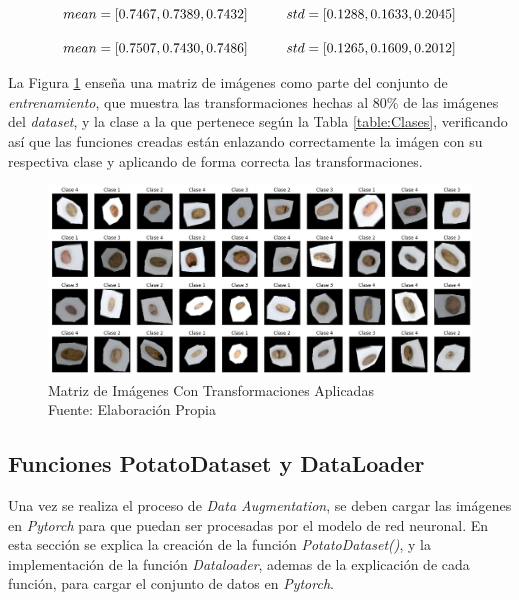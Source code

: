 \begin{equation}				{mean = [0.7467, 0.7389, 0.7432] \hspace*{1cm}  std  = [0.1288, 0.1633, 0.2045]}
	\label{eq:meanstd1}
\end{equation}


\begin{equation}
	{mean = [0.7507, 0.7430, 0.7486] \hspace*{1cm}  std  = [0.1265, 0.1609, 0.2012]}
	\label{eq:meanstd2}
\end{equation}

\vspace{0.3cm}
La Figura \ref{fig:agumentation} enseña una matriz de imágenes como parte del conjunto de \textit{entrenamiento}, que muestra las transformaciones hechas al $80\%$ de las imágenes del \textit{dataset}, y la clase a la que pertenece según la Tabla \ref{table:Clases}, verificando así que las funciones creadas están enlazando correctamente la imágen con su respectiva clase y aplicando de forma correcta las transformaciones.

\newpage
\begin{figure}[ht]
	\centering
	\includegraphics[scale=0.4]{Figs/augmentation.png}
	\caption{Matriz de Imágenes Con Transformaciones Aplicadas \\ Fuente: Elaboración Propia}
	\label{fig:agumentation}
\end{figure}	

\subsection{Funciones PotatoDataset y DataLoader}

Una vez se realiza el proceso de \textit{Data Augmentation}, se deben cargar las imágenes en \textit{Pytorch} para que puedan ser procesadas por el modelo de red neuronal. En esta sección se explica la creación de la función \textit{PotatoDataset()}, y la implementación de la función \textit{Dataloader}, ademas de la explicación de cada función, para cargar el conjunto de datos en \textit{Pytorch}.


